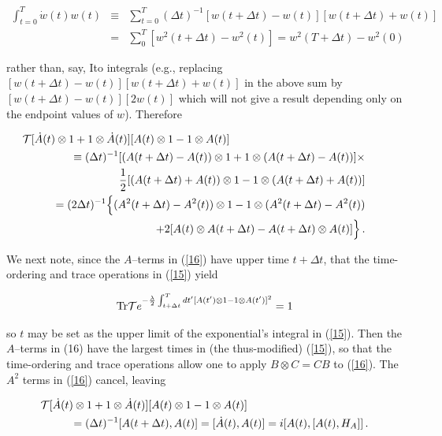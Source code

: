 \documentclass[12pt]{article}
\begin{document}
\begin{eqnarray*}
\int_{t=0}^{T}\dot{w}(t)w(t)&\equiv&
\sum_{t=0}^{T}(\Delta t)^{-1}[w(t+\Delta t)-w(t)][w(t+\Delta t)+w(t)]\\
&=&\sum_{0}^{T}[w^{2}(t+\Delta t)-w^{2}(t)]= w^{2}(T+\Delta t)-w^{2}(0)	
\end{eqnarray*}
	
\noindent rather than, say, Ito integrals (e.g., replacing $[w(t+\Delta t)-w(t)][w(t+\Delta t)+w(t)]$ 
in the above sum by $[w(t+\Delta t)-w(t)][2w(t)]$ which will not give 
a result depending only on the endpoint values of $w$). Therefore{\hfill} 
\break

\begin{eqnarray}\label{16}
\lefteqn{\!\!\!\!\!\!\!\!\!\!\!\!{\cal T}[\dot{A}(t)\otimes 1+1\otimes \dot{A}(t)][A(t)\otimes 1-1\otimes A(t)]
\nonumber}\\
&&\equiv(\Delta t)^{-1}[(A(t+\Delta t)-A(t))
\otimes 1+1\otimes(A(t+\Delta t)-A(t))]\times\nonumber\\ 
&&\qquad\qquad\frac{1}{2}[(A(t+\Delta t)+A(t))\otimes 1-
1\otimes (A(t+\Delta t)+A(t))]\nonumber\\
&&=(2\Delta t)^{-1}\Bigl\{ (A^{2}(t+\Delta t)-A^{2}(t))\otimes 1
-1\otimes(A^{2}(t+\Delta t)-A^{2}(t))\nonumber\\
&&\qquad\qquad+2[A(t)\otimes A(t+\Delta t)-A(t+\Delta t)\otimes A(t)]\Bigr\}\, .
\end{eqnarray}

\noindent We next note, since  the $A$--terms in (\ref{16}) have upper 
time $t+\Delta t$, that the time-ordering and trace operations in (\ref{15}) yield  

\begin{eqnarray*}
{\rm Tr}{\cal T}e^{-\frac{\lambda}{2}\int_{t+\Delta t}^{T}dt'
[A(t')\otimes 1-1\otimes A(t')]^{2}}=1
\end{eqnarray*}

\noindent  so $t$ may be set as the 
upper limit of the exponential's integral in (\ref{15}).   
Then the $A$--terms in (16) have the largest times in (the thus-modified) (\ref{15}), so that 
the time-ordering and trace operations allow one to apply $B\otimes C=CB$ to 
(\ref{16}). The $A^{2}$ terms in (\ref{16}) cancel, leaving 

\begin{eqnarray}\label{17}
\lefteqn{{\cal T}[\dot{A}(t)\otimes 1+1\otimes \dot{A}(t)][A(t)\otimes 1-1\otimes A(t)]}\nonumber\\ 
&&\qquad=(\Delta t)^{-1}[A(t+\Delta t),A(t)]= [\dot{A}(t),A(t)]=i[A(t),[A(t),H_{A}]]\, .
\end{eqnarray}
\end{document}
